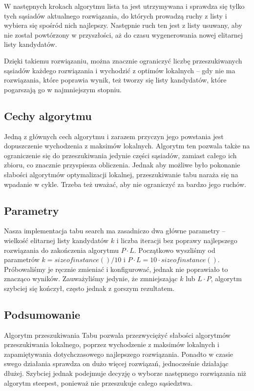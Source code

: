 W następnych krokach algorytmu lista ta jest utrzymywana i sprawdza się tylko tych sąsiadów aktualnego rozwiązania, do których prowadzą ruchy z listy i wybiera się spośród nich najlepszy. Następnie ruch ten jest z listy usuwany, aby nie został powtórzony w przyszłości, aż do czasu wygenerowania nowej elitarnej listy kandydatów.

Dzięki takiemu rozwiązaniu, można znacznie ograniczyć liczbę przeszukiwanych sąsiadów każdego rozwiązania i wychodzić z optimów lokalnych -- gdy nie ma rozwiązania, które poprawia wynik, też tworzy się listy kandydatów, które pogarszają go w najmniejszym stopniu.

\subsection{Cechy algorytmu}

Jedną z głównych cech algorytmu i zarazem przyczyn jego powstania jest dopuszczenie wychodzenia z maksimów lokalnych. Algorytm ten pozwala także na ograniczenie się do przeszukiwania jedynie części sąsiadów, zamiast całego ich zbioru, co znacznie przyspiesza obliczenia. Jednak aby możliwe było pokonanie słabości algorytmów optymalizacji lokalnej, przeszukiwanie tabu naraża się na wpadanie w cykle. Trzeba też uważać, aby nie ograniczyć za bardzo jego ruchów.

\subsection{Parametry}

Nasza implementacja tabu search ma zasadniczo dwa główne parametry -- wielkość elitarnej listy kandydatów $k$ i liczba iteracji bez poprawy najlepszego rozwiązania do zakończenia algorytmu $P \cdot L$.
Początkowo wyszliśmy od parametrów $k = sizeofinstance() / 10$ i $P \cdot L = 10 \cdot sizeofinstance()$. Próbowaliśmy je ręcznie zmieniać i konfigurować, jednak nie poprawiało to znacząco wyników. Zauważyliśmy jedynie, że zmniejszając $k$ lub $L \cdot P$, algorytm szybciej się kończył, często jednak z gorszym rezultatem.

\subsection{Podsumowanie}

Algorytm przeszukiwania Tabu pozwala przezwyciężyć słabości algorytmów przeszukiwania lokalnego, poprzez wychodzenie z maksimów lokalnych i zapamiętywania dotychczasowego najlepszego rozwiązania. Ponadto w czasie swego działania sprawdza on dużo więcej rozwiązań, jednocześnie działając dłużej. Szybciej jednak podejmuje decyzję o wyborze następnego rozwiązania niż algorytm steepest, ponieważ nie przeszukuje całego sąsiedztwa.